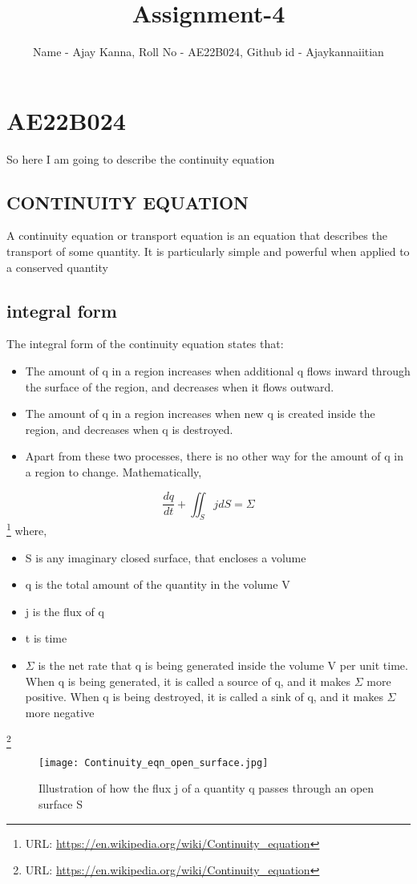 \documentclass{article}
\title{Assignment-4}
\author{Name - Ajay Kanna, Roll No - AE22B024, Github id - Ajaykannaiitian}
\begin{document}
\maketitle
\section{AE22B024}
So here I am going to describe the continuity equation
\subsection{CONTINUITY EQUATION}
A continuity equation or transport equation is an equation that describes the transport of some quantity. It is particularly simple and powerful when applied to a conserved quantity
\subsection{integral form}
The integral form of the continuity equation states that:
\begin{itemize}
  \item The amount of q in a region increases when additional q flows inward through the surface of the region, and decreases when it flows outward.
  \item The amount of q in a region increases when new q is created inside the region, and decreases when q is destroyed.
  \item Apart from these two processes, there is no other way for the amount of q in a region to change.
Mathematically,
\end{itemize}
\begin{equation}
    \frac{dq}{dt} + \iint_S jdS = \Sigma
\end{equation}
\footnote{URL: \url{https://en.wikipedia.org/wiki/Continuity_equation}}
where,
\begin{itemize}
    \item S is any imaginary closed surface, that encloses a volume 
    \item q is the total amount of the quantity in the volume V
    \item j is the flux of q
    \item t is time
    \item $\Sigma$  is the net rate that q is being generated inside the volume V per unit time. When q is being generated, it is called a source of q, and it makes $\Sigma$ more positive. When q is being destroyed, it is called a sink of q, and it makes $\Sigma$ more negative
\end{itemize}
\cite{boris1976solution}
\footnote{URL: \url{https://en.wikipedia.org/wiki/Continuity_equation}}
\begin{figure}
    \centering
    \texttt{[image: Continuity\_eqn\_open\_surface.jpg]}
    \caption{Illustration of how the flux j of a quantity q passes through an open surface S}
    \label{fig:enter-label}
\end{figure}
\end{document}

